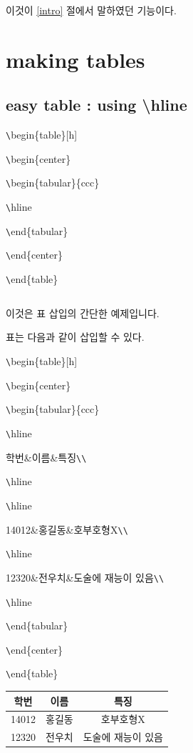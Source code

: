 \documentclass[11pt]{article}
\begin{document}
이것이 \ref{intro} 절에서 말하였던 기능이다.

\section{making tables}
\subsection{easy table : using \textbackslash hline}

\verb+\+begin\{table\}[h]

\verb+\+begin\{center\}

\verb+\+begin\{tabular\}\{\textbar c\textbar c\textbar c\textbar\}

\verb+\+hline

\verb+\+end\{tabular\}

\verb+\+end\{center\}

\verb+\+end\{table\}


\begin{table}[h]
	\begin{center}
		\begin{tabular}{|c|c|c|}
			\hline
		\end{tabular}
	\end{center}
\end{table}

이것은 표 삽입의 간단한 예제입니다.

표는 다음과 같이 삽입할 수 있다.

\verb+\+begin\{table\}[h]

\verb+\+begin\{center\}

\verb+\+begin\{tabular\}\{\textbar c\textbar c\textbar c\textbar\}

\verb+\+hline

학번\&이름\&특징\verb+\+\verb+\+

\verb+\+hline

\verb+\+hline

14012\&홍길동\&호부호형X\verb+\+\verb+\+

\verb+\+hline

12320\&전우치\&도술에 재능이 있음\verb+\+\verb+\+

\verb+\+hline

\verb+\+end\{tabular\}

\verb+\+end\{center\}

\verb+\+end\{table\}


\begin{table}[!h]
	\begin{center}
		\begin{tabular}{|c|c|c|}
			\hline
			학번&이름&특징\\
			\hline
			\hline
			14012&홍길동&호부호형X\\
			\hline
			12320&전우치&도술에 재능이 있음\\
			\hline
		\end{tabular}
	\end{center}
\end{table}
\end{document}
